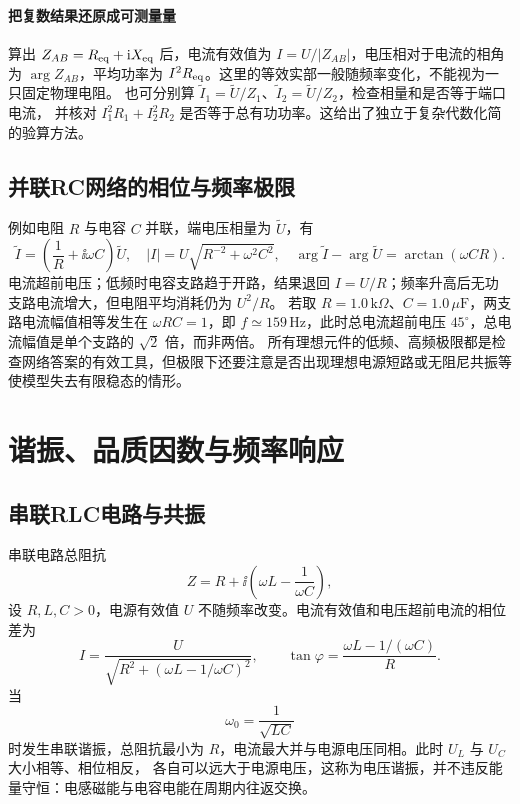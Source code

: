 
\paragraph{把复数结果还原成可测量量}
算出 $Z_{AB}=R_{\rm eq}+\mathrm i X_{\rm eq}$ 后，电流有效值为 $I=U/|Z_{AB}|$，电压相对于电流的相角为
$\arg Z_{AB}$，平均功率为 $I^2R_{\rm eq}$。这里的等效实部一般随频率变化，不能视为一只固定物理电阻。
也可分别算 $\widetilde I_1=\widetilde U/Z_1$、$\widetilde I_2=\widetilde U/Z_2$，检查相量和是否等于端口电流，
并核对 $I_1^2R_1+I_2^2R_2$ 是否等于总有功功率。这给出了独立于复杂代数化简的验算方法。


\subsection{并联RC网络的相位与频率极限}
例如电阻 $R$ 与电容 $C$ 并联，端电压相量为 $\widetilde U$，有
\[
 \widetilde I=\left(\frac1R+\ii\omega C\right)\widetilde U,
 \quad |I|=U\sqrt{R^{-2}+\omega^2C^2},
 \quad \arg\widetilde I-\arg\widetilde U=\arctan(\omega CR).
\]
电流超前电压；低频时电容支路趋于开路，结果退回 $I=U/R$；频率升高后无功支路电流增大，但电阻平均消耗仍为 $U^2/R$。
若取 $R=1.0\,\mathrm{k}\Omega$、$C=1.0\,\mu\mathrm F$，两支路电流幅值相等发生在 $\omega RC=1$，即 $f\simeq159\,\mathrm{Hz}$，此时总电流超前电压 $45^\circ$，总电流幅值是单个支路的 $\sqrt2$ 倍，而非两倍。
所有理想元件的低频、高频极限都是检查网络答案的有效工具，但极限下还要注意是否出现理想电源短路或无阻尼共振等使模型失去有限稳态的情形。



\section{谐振、品质因数与频率响应}

\subsection{串联RLC电路与共振}


串联电路总阻抗
\begin{equation}
 Z=R+\ii\left(\omega L-\frac1{\omega C}\right),
\end{equation}
设 $R,L,C>0$，电源有效值 $U$ 不随频率改变。电流有效值和电压超前电流的相位差为
\begin{equation}
 I=\frac{U}{\sqrt{R^2+(\omega L-1/\omega C)^2}},
 \qquad
 \tan\varphi=\frac{\omega L-1/(\omega C)}R.
\end{equation}
当
\begin{equation}
 \omega_0=\frac1{\sqrt{LC}}
\end{equation}
时发生串联谐振，总阻抗最小为 $R$，电流最大并与电源电压同相。此时 $U_L$ 与 $U_C$ 大小相等、相位相反，
各自可以远大于电源电压，这称为电压谐振，并不违反能量守恒：电感磁能与电容电能在周期内往返交换。

